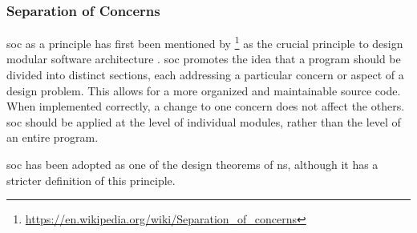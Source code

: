 \subsubsection{Separation of Concerns} \label{subsubsec_soc}

\gls{soc} as a principle has first been mentioned by
\citeauthor{dijkstra_selected_1982}\footnote{\url{https://en.wikipedia.org/wiki/Separation_of_concerns}}
as the crucial principle to design modular software architecture
\parencite[]{dijkstra_selected_1982}. \gls{soc} promotes the idea that a program should be
divided into distinct sections, each addressing a particular concern or aspect of a design
problem. This allows for a more organized and maintainable source code. When implemented
correctly, a change to one concern does not affect the others. \gls{soc} should be applied
at the level of individual modules, rather than the level of an entire program.

\gls{soc} has been adopted as one of the design theorems of \gls{ns}, although it has a
stricter definition of this principle\parencite{mannaert_normalized_2016}.

